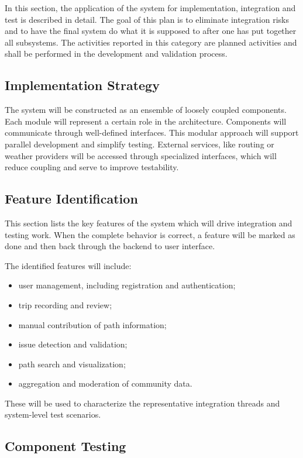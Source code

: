
In this section, the application of the system for implementation, integration and test is described in detail.
The goal of this plan is to eliminate integration risks and to have the final system do what it is supposed to after one has put together all subsystems.
The activities reported in this category are planned activities and shall be performed in the development and validation process. 

\subsection{Implementation Strategy}

The system will be constructed as an ensemble of loosely coupled components. Each module will represent a certain role in the architecture.
Components will communicate through well-defined interfaces. This modular approach will support parallel development and simplify testing. External services, like routing or weather providers will be accessed through
specialized interfaces, which will reduce coupling and serve to improve testability.

\subsection{Feature Identification}

This section lists the key features of the system which will drive integration and testing work. When the complete behavior is correct, a feature will be marked as done
and then back through the backend to user interface.

The identified features will include:
\begin{itemize}
    \item user management, including registration and authentication;
    \item trip recording and review;
    \item manual contribution of path information;
    \item issue detection and validation;
    \item path search and visualization;
    \item aggregation and moderation of community data.
\end{itemize}

These will be used to characterize the representative integration threads and system-level test scenarios.


\subsection{Component Testing}

